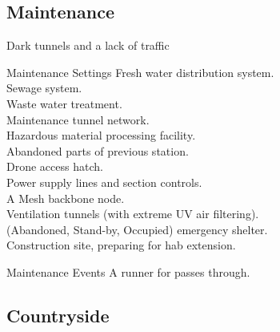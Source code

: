 \begin{multicols}{2}


\subsection*{Maintenance}

Dark tunnels and a lack of traffic 

\end{multicols}

\begin{tableone}{Maintenance Settings}
Fresh water distribution system.\\
Sewage system.\\
Waste water treatment.\\
Maintenance tunnel network.\\
Hazardous material processing facility.\\
Abandoned parts of previous station.\\
Drone access hatch.\\
Power supply lines and section controls.\\
A Mesh backbone node.\\
Ventilation tunnels (with extreme UV air filtering).\\
(Abandoned, Stand-by, Occupied) emergency shelter.\\
Construction site, preparing for hab extension.\\
\end{tableone}

\begin{tableone}{Maintenance Events}
A runner for  passes through.\\
\end{tableone}






\subsection*{Countryside}

